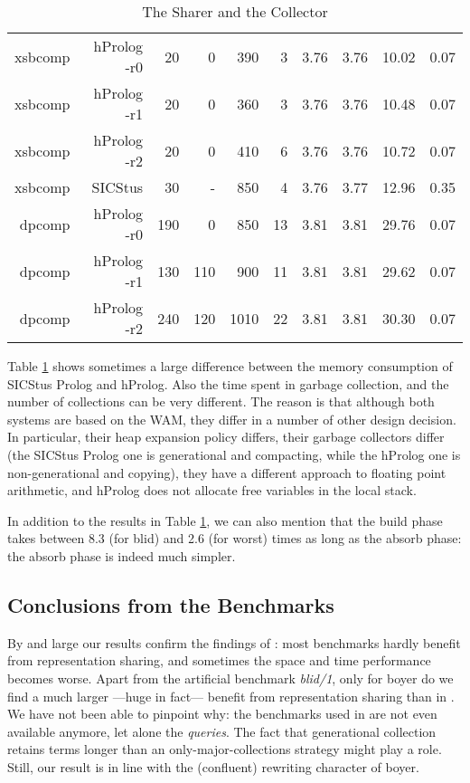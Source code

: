 \documentclass{tlp}
\begin{document}
\begin{table}[!]
\begin{center}
\begin{tabular}{|r|r||r|r|r||r|r|r|r|r|}
xsbcomp & hProlog -r0 & 20 & 0 & 390 & 3 & 3.76 & 3.76 & 10.02 & 0.07 \\ 
xsbcomp & hProlog -r1 & 20 & 0 & 360 & 3 & 3.76 & 3.76 & 10.48 & 0.07 \\ 
xsbcomp & hProlog -r2 & 20 & 0 & 410 & 6 & 3.76 & 3.76 & 10.72 & 0.07 \\ 
xsbcomp & SICStus  & 30 & - & 850 & 4 & 3.76 & 3.77 & 12.96 & 0.35 \\ 
\hline 

dpcomp & hProlog -r0 & 190 & 0 & 850 & 13 & 3.81 & 3.81 & 29.76 & 0.07 \\ 
dpcomp & hProlog -r1 & 130 & 110 & 900 & 11 & 3.81 & 3.81 & 29.62 & 0.07 \\ 
dpcomp & hProlog -r2 & 240 & 120 & 1010 & 22 & 3.81 & 3.81 & 30.30 & 0.07 \\ 
\hline 

\end{tabular}

\end{center}
\caption{The Sharer and the Collector}\label{sharertimespace}
\end{table}
\begin{sloppypar}
Table \ref{sharertimespace} shows sometimes a large difference between
the memory consumption of SICStus Prolog and hProlog. Also the time
spent in garbage collection, and the number of collections can be very
different. The reason is that although both systems are based on the
WAM, they differ in a number of other design decision. In particular,
their heap expansion policy differs, their garbage collectors differ
(the SICStus Prolog one is generational and compacting, while the
hProlog one is non-generational and copying), they have a different
approach to floating point arithmetic, and hProlog does not allocate
free variables in the local stack.
\end{sloppypar}


In addition to the results in Table \ref{sharertimespace}, we can also
mention that the build phase takes between 8.3 (for blid) and 2.6 (for
worst) times as long as the absorb phase: the absorb phase is indeed
much simpler.



\subsection{Conclusions from the Benchmarks}

By and large our results confirm the findings of
\cite{appelhashconsinggc}: most benchmarks hardly benefit from
representation sharing, and sometimes the space and time performance
becomes worse. Apart from the artificial benchmark {\em blid/1}, only for boyer
do we find a much larger ---huge in fact--- benefit from representation
sharing than in \cite{appelhashconsinggc}. We have not been able to
pinpoint why: the benchmarks used in \cite{appelhashconsinggc} are not
even available anymore, let alone the {\em queries}. The fact that
generational collection retains terms longer than an
only-major-collections strategy might play a role. Still, our result
is in line with the (confluent) rewriting character of boyer.
\end{document}

